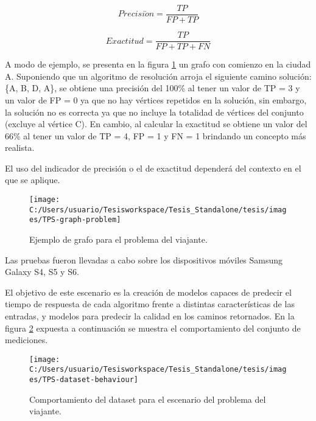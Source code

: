 \[
Precisi\acute{o}n=\frac{TP}{FP+TP}
\]


\[
Exactitud=\frac{TP}{FP+TP+FN}
\]


A modo de ejemplo, se presenta en la figura \ref{fig:TPS-graph-problem}
un grafo con comienzo en la ciudad A. Suponiendo que un algoritmo
de resolución arroja el siguiente camino solución: \{A, B, D, A\},
se obtiene una precisión del 100\% al tener un valor de \ac{TP} =
3 y un valor de \ac{FP} = 0 ya que no hay vértices repetidos en la
solución, sin embargo, la solución no es correcta ya que no incluye
la totalidad de vértices del conjunto (excluye al vértice C). En cambio,
al calcular la exactitud se obtiene un valor del 66\% al tener un
valor de \ac{TP} = 4, \ac{FP} = 1 y \ac{FN} = 1 brindando un concepto
más realista. 

El uso del indicador de precisión o el de exactitud dependerá del
contexto en el que se aplique. 

\begin{figure}[H]
\begin{centering}
\texttt{[image: C:/Users/usuario/Tesisworkspace/Tesis\_Standalone/tesis/images/TPS-graph-problem]}
\par\end{centering}

\caption{Ejemplo de grafo para el problema del viajante.\label{fig:TPS-graph-problem}}
\end{figure}


Las pruebas fueron llevadas a cabo sobre los dispositivos móviles
Samsung Galaxy S4, S5 y S6.

El objetivo de este escenario es la creación de modelos capaces de
predecir el tiempo de respuesta de cada algoritmo frente a distintas
características de las entradas, y modelos para predecir la calidad
en los caminos retornados. En la figura \ref{fig:TPS-dataset-behaviour}
expuesta a continuación se muestra el comportamiento del conjunto
de mediciones.

\begin{figure}[H]
\begin{centering}
\texttt{[image: C:/Users/usuario/Tesisworkspace/Tesis\_Standalone/tesis/images/TPS-dataset-behaviour]}
\par\end{centering}

\caption{Comportamiento del dataset para el escenario del problema del viajante.\label{fig:TPS-dataset-behaviour}}
\end{figure}


